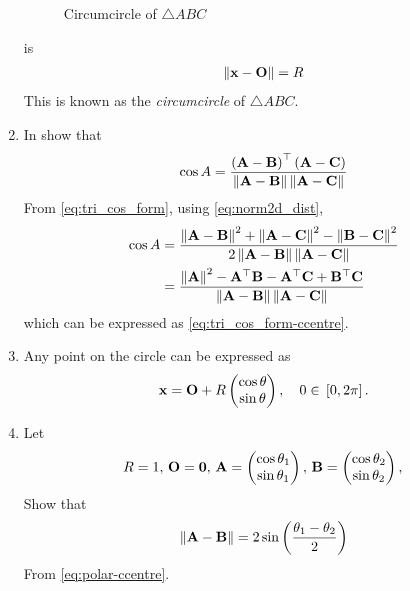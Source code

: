 \begin{enumerate}[label=\thesection.\arabic*.,ref=\thesection.\theenumi]
\begin{figure}[!ht]
	\begin{center}
		\resizebox{\columnwidth}{!}{}
	\end{center}
	\caption{Circumcircle of $\triangle ABC$}
	\label{fig:tri_ccircle-ang}	
\end{figure}
	is
  \begin{align}
	  \left\lVert\mathbf{x}-\mathbf{O}\right\rVert = R
  \end{align}
  This is known as the {\em circumcircle} of $\triangle ABC$.
  \item In 
	show that 
\begin{equation}
	\cos A= 	\frac{\brak{\vec{A}-
	\vec{B}}^{\top}\brak{\vec{A}-\vec{C}}}{\norm{\vec{A}-\vec{B}}\norm{\vec{A}-\vec{C}}}
\label{eq:tri_cos_form-ccentre}
\end{equation}
\solution
From 
\eqref{eq:tri_cos_form}, using 
  \eqref{eq:norm2d_dist},
\begin{align}
\label{eq:tri_cos_form-ccentre-norm}
	\cos A&= 	\frac{\norm{\vec{A}-\vec{B}}^2+\norm{\vec{A}-\vec{C}}^2-\norm{\vec{B}-\vec{C}}^2}{2\norm{\vec{A}-\vec{B}}\norm{\vec{A}-\vec{C}}}
	\\
	&= 	\frac{\norm{\vec{A}}^2-\vec{A}^{\top}\vec{B}-\vec{A}^{\top}\vec{C}+\vec{B}^{\top}\vec{C}}{\norm{\vec{A}-\vec{B}}\norm{\vec{A}-\vec{C}}}
\end{align}
which can be expressed as 
\eqref{eq:tri_cos_form-ccentre}.
\item Any point on the circle can be expressed as 
  \begin{align}
	  \vec{x} = \vec{O} + R\myvec{\cos \theta \\ \sin \theta}, \quad 0 \in \sbrak{0, 2\pi}
\label{eq:polar-ccentre}.
  \end{align}
  \item Let
  \begin{align}
	  R = 1,\,
	  \mathbf{O} = \mathbf{0} ,\,
	  \mathbf{A} = \begin{pmatrix}\cos \theta_1 \\ \sin \theta_1\end{pmatrix},\,
	  \mathbf{B} = \begin{pmatrix}\cos \theta_2 \\ \sin \theta_2\end{pmatrix},\,
  \end{align}
Show that 
  \begin{align}
	  \norm{\vec{A}-\vec{B}} = 
	   2 \sin \brak{\frac{\theta_1-\theta_2}{2}}
\label{eq:norm-polar-ccentre}
  \end{align}
  \solution 
  From 
\eqref{eq:polar-ccentre}.
  \begin{align}

\end{align}
\end{enumerate}
